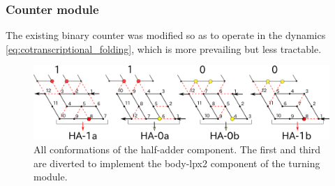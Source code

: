 			\subsubsection{Counter module}

The existing binary counter \cite{GeMeScSe2016} was modified so as to operate in the dynamics \eqref{eq:cotranscriptional_folding}, which is more prevailing \cite{GeMeScSe2015,HanKim2017,HaKiOtSe2016,OtaSeki2017} but less tractable. 

\begin{figure}
\centering
\includegraphics[width=\linewidth]{pic/counter_zig.png}
\caption{All conformations of the half-adder component.
The first and third are diverted to implement the body-lpx2 component of the turning module. 
}
\label{fig:half-adder}
\end{figure}

